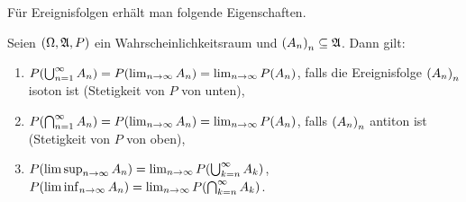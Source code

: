 \documentclass{lecture}
\begin{document}
    Für Ereignisfolgen erhält man folgende Eigenschaften.

    \begin{lemma}
        Seien \(\parentheses*{\Omega, \mathfrak{A}, P}\) ein Wahrscheinlichkeitsraum und \(\parentheses*{A_n}_n \subseteq \mathfrak{A}\).
        Dann gilt:
        \begin{enumerate}
            \item \(P\parentheses*{\bigcup_{n = 1}^\infty A_n} = P\parentheses*{\lim_{n \to \infty}A_n} = \lim_{n \to \infty}P\parentheses*{A_n}\), falls die Ereignisfolge \(\parentheses*{A_n}_n\) isoton ist (Stetigkeit von \(P\) von unten),
            \item \(P\parentheses*{\bigcap_{n = 1}^\infty A_n} = P\parentheses*{\lim_{n \to \infty}A_n} = \lim_{n \to \infty}P\parentheses*{A_n}\), falls \(\parentheses*{A_n}_n\) antiton ist (Stetigkeit von \(P\) von oben),
            \item \(P\parentheses*{\limsup_{n \to \infty}A_n} = \lim_{n \to \infty}P\parentheses*{\bigcup_{k = n}^\infty A_k}\), \(P\parentheses*{\liminf_{n \to \infty}A_n} = \lim_{n \to \infty}P\parentheses*{\bigcap_{k = n}^\infty A_k}\).
        \end{enumerate}
    \end{lemma}
\end{document}
